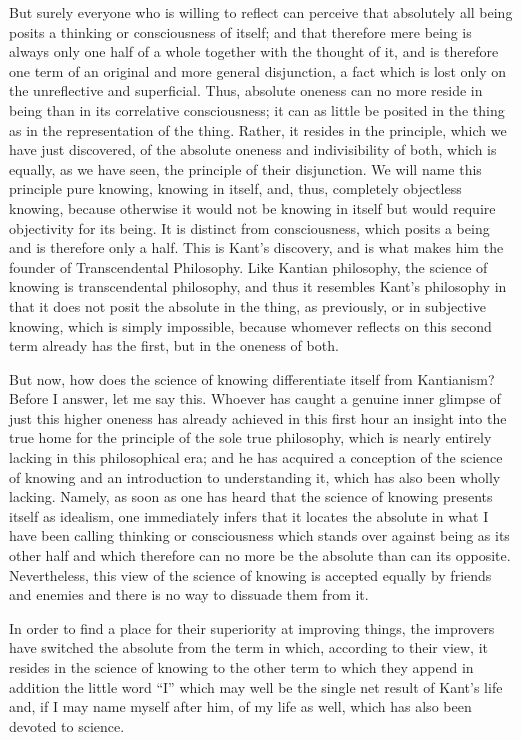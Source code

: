 But surely everyone who is willing to reflect can perceive that
absolutely all being posits a thinking or consciousness of itself;
and that therefore mere being is always only one half of a whole
together with the thought of it, and is therefore
one term of an original and more general disjunction,
a fact which is lost only on the unreflective and superficial.
Thus, absolute oneness can no more reside in being than in its
correlative consciousness;
it can as little be posited in the thing as
in the representation of the thing.
Rather, it resides in the principle,
which we have just discovered, of
the absolute oneness and indivisibility of both,
which is equally, as we have seen,
the principle of their disjunction.
We will name this principle pure knowing, knowing in itself, and,
thus, completely objectless knowing, because otherwise
it would not be knowing in itself but
would require objectivity for its being.
It is distinct from consciousness,
which posits a being and is therefore only a half.
This is Kant's discovery, and is what makes him
the founder of Transcendental Philosophy.
Like Kantian philosophy, the science of knowing is
transcendental philosophy,
and thus it resembles Kant's philosophy in that it does not posit
the absolute in the thing, as previously, or
in subjective knowing, which is simply impossible,
because whomever reflects on this second term already has the first,
but in the oneness of both.

But now, how does the science of knowing
differentiate itself from Kantianism?
Before I answer, let me say this.
Whoever has caught a genuine inner glimpse of just
this higher oneness has already achieved in this first hour
an insight into the true home for
the principle of the sole true philosophy,
which is nearly entirely lacking in this philosophical era;
and he has acquired a conception of the science of knowing
and an introduction to understanding it,
which has also been wholly lacking.
Namely, as soon as one has heard that
the science of knowing presents itself as idealism,
one immediately infers that it locates the absolute
in what I have been calling thinking or consciousness
which stands over against being as its other half and
which therefore can no more be the absolute than can its opposite.
Nevertheless, this view of the science of knowing is accepted
equally by friends and enemies and there is no
way to dissuade them from it.

In order to find a place for their superiority at improving things,
the improvers have switched the absolute from the term in which,
according to their view, it resides in the science of knowing
to the other term to which they append in addition the little word “I”
which may well be the single net result of Kant's life
and, if I may name myself after him, of my life as well,
which has also been devoted to science.

